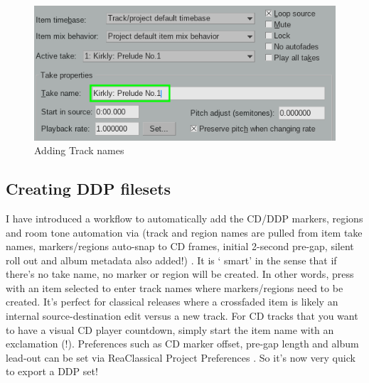 \documentclass[10pt,american]{article}
\begin{document}
\begin{figure}
\begin{centering}
\includegraphics[scale=0.75]{user_guide_images/takename}
\par\end{centering}
\caption{Adding Track names}

\end{figure}


\subsection{Creating DDP filesets}

I have introduced a workflow to automatically add the CD/DDP markers, regions
and room tone automation via  (track and region names are pulled from
item take names, markers/regions auto-snap to CD frames, initial 2-second
pre-gap, silent roll out and album metadata also added!) . It is \textquoteleft
smart\textquoteright{} in the sense that if there's no take name, no marker or
region will be created. In other words, press  with an item selected to
enter track names where markers/regions need to be created. It's perfect for
classical releases where a crossfaded item is likely an internal
source-destination edit versus a new track. For CD tracks that you want to have
a visual CD player countdown, simply start the item name with an exclamation
(!). Preferences such as CD marker offset, pre-gap length and album lead-out can
be set via ReaClassical Project Preferences  . So it's now very quick
to export a DDP set!

\noindent{}
\end{document}
